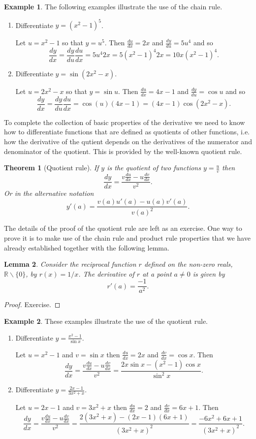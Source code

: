 \documentclass[extrafontsizes, twoside, a4paper]{memoir}
\theoremstyle{plain}%
\newtheorem{thm}{Theorem}[chapter]
\newtheorem{lem}[thm]{Lemma}
\theoremstyle{definition}
\newtheorem{exmp}{Example}[chapter]
\theoremstyle{remark}
\begin{document}
\begin{exmp}
The following examples illustrate the use of the chain rule.
\begin{enumerate}
\item
Differentiate $y=(x^2 -1)^5$.

Let $u = x^2 -1$ so that $y=u^5$. Then $\frac{du}{dx} = 2x$ and $\frac{dy}{du} = 5u^4$ and so
$$\frac{dy}{dx} = \frac{dy}{du} \frac{du}{dx} = 5u^4 2x = 5(x^2 - 1)^4 2x = 10x (x^2 -1)^4.$$
\item
Differentiate $y= \sin{(2x^2 - x)}$.

Let $u=2x^2 - x$ so that $y=\sin{u}$. Then $\frac{du}{dx} = 4x - 1$ and $\frac{dy}{du} = \cos{u}$ and so
$$ \frac{dy}{dx} = \frac{dy}{du} \frac{du}{dx} = \cos{(u)} (4x -1) = (4x-1) \cos{(2x^2 - x)}.$$
\end{enumerate}
\end{exmp}
To complete the collection of basic properties of the derivative we need to know how to differentiate functions that are defined as quotients of other functions, i.e. how the derivative of the qutient depends on the derivatives of the numerator and denominator of the quotient. This is provided by the well-known quotient rule.
\begin{thm}[Quotient rule]
If $y$ is the quotient of two functions $y=\frac{u}{v}$ then
$$ \frac{dy}{dx} = \frac{v \frac{du}{dx} - u \frac{dv}{dx}}{v^2}.$$
Or in the alternative notation
$$y'(a) = \frac{v(a)u'(a) - u(a)v'(a)}{v(a)^2}.$$
\end{thm}
The details of the proof of the quotient rule are left as an exercise. One way to prove it is to make use of the chain rule and product rule properties that we have already established together with the following lemma.
\begin{lem}
Consider the reciprocal function $r$ defined on the non-zero reals, $\mathbb{R} \backslash \{0\}$, by $r(x) = 1/x$. The derivative of $r$ at a point $a \neq 0$ is given by
$$r'(a) = \frac{-1}{a^2}.$$
\end{lem}
\begin{proof}
Exercise.
\end{proof}

\begin{exmp}
These examples illustrate the use of the quotient rule.
\begin{enumerate}
\item
Differentiate $y = \frac{x^2 - 1}{\sin{x}}$.

Let $u=x^2 -1$ and $v= \sin{x}$ then $\frac{du}{dx}= 2x$ and $\frac{dv}{dx} = \cos{x}$. Then
$$ \frac{dy}{dx} = \frac{v \frac{du}{dx} - u \frac{dv}{dx}}{v^2} = \frac{2x \sin{x} - (x^2 -1)\cos{x}}{\sin^2 x}.$$
\item
Differentiate $y=\frac{2x-1}{3x^2 + x}$.

Let $u=2x -1$ and $v= 3x^2 +x$ then $\frac{du}{dx}= 2$ and $\frac{dv}{dx} = 6x+1$. Then
$$ \frac{dy}{dx} = \frac{v \frac{du}{dx} - u \frac{dv}{dx}}{v^2} = \frac{2(3x^2 +x) - (2x-1)(6x+1)}{(3x^2+x)^2} = \frac{-6x^2 + 6x + 1}{(3x^2 + x)^2}.$$
\end{enumerate}
\end{exmp}
\end{document}
